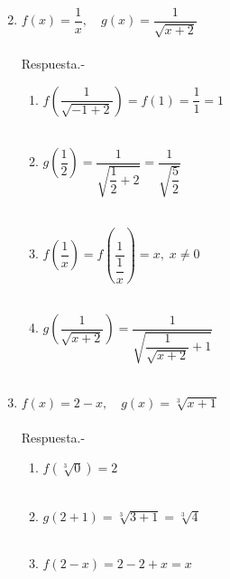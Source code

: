 \begin{enumerate}[\bfseries 1.]
\begin{multicols}{2}
\begin{enumerate}[\bfseries a)]
\end{enumerate}
\end{multicols}

\item $f(x) = \dfrac{1}{x}, \quad g(x)=\dfrac{1}{\sqrt{x+2}}$\\\\
    Respuesta.-\; 
    \begin{enumerate}[\bfseries a)]

	\item $f\left(\dfrac{1}{\sqrt{-1+2}} \right) = f(1) = \dfrac{1}{1} = 1$\\\\

	\item $g\left(\dfrac{1}{2}\right) = \dfrac{1}{\sqrt{\dfrac{1}{2} + 2}} = \dfrac{1}{\sqrt{\dfrac{5}{2}}}$\\\\

	\item $f\left(\dfrac{1}{x}\right) = f\left(\dfrac{1}{\dfrac{1}{x}}\right) = x,\; x\neq 0$\\\\

	\item $g\left(\dfrac{1}{\sqrt{x+2}}\right) = \dfrac{1}{\sqrt{\dfrac{1}{\sqrt{x+2}}+1}}$\\\\
	    
    \end{enumerate}

\item $f(x) = 2-x, \quad g(x) = \sqrt[3]{x+1}$\\\\
    Respuesta.-\; 

    \begin{enumerate}[\bfseries a)]

	\item $f(\sqrt[3]{0}) = 2$\\\\

	\item $g(2+1) = \sqrt[3]{3 + 1} = \sqrt[3]{4}$\\\\

	\item $f(2-x) = 2 - 2 + x = x$\\\\


\end{enumerate}
\end{enumerate}
